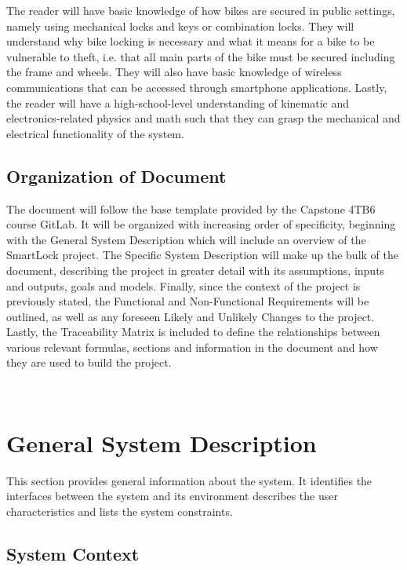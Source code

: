 \documentclass[12pt]{article}
\begin{document}
The reader will have basic knowledge of how bikes are secured in public settings, namely using mechanical locks and keys or combination locks. They will understand why bike locking is necessary and what it means for a bike to be vulnerable to theft, i.e. that all main parts of the bike must be secured including the frame and wheels. They will also have basic knowledge of wireless communications that can be accessed through smartphone applications. Lastly, the reader will have a high-school-level understanding of kinematic and electronics-related physics and math such that they can grasp the mechanical and electrical functionality of the system.  

\subsection{Organization of Document}

The document will follow the base template provided by the Capstone 4TB6 course GitLab. It will be organized with increasing order of specificity, beginning with the General System Description which will include an overview of the SmartLock project. The Specific System Description will make up the bulk of the document, describing the project in greater detail with its assumptions, inputs and outputs, goals and models. Finally, since the context of the project is previously stated, the Functional and Non-Functional Requirements will be outlined, as well as any foreseen Likely and Unlikely Changes to the project. Lastly, the Traceability Matrix is included to define the relationships between various relevant formulas, sections and information in the document and how they are used to build the project.  

~\newpage

\section{General System Description}

This section provides general information about the system. It identifies the interfaces between the system and its environment describes the user characteristics and lists the system constraints.  

\subsection{System Context}
\end{document}
